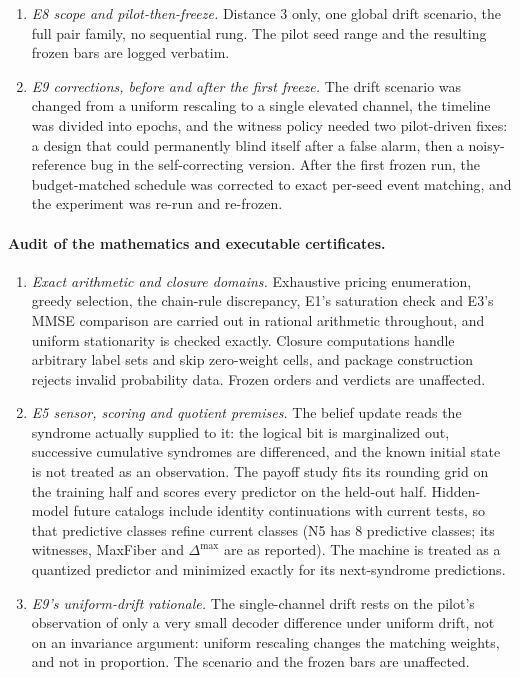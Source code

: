 \begin{enumerate}
\item \emph{E8 scope and pilot-then-freeze.} Distance 3 only, one global drift scenario, the full pair family, no sequential rung. The pilot seed range and the resulting frozen bars are logged verbatim. %
\item \emph{E9 corrections, before and after the first freeze.} The drift scenario was changed from a uniform rescaling to a single elevated channel, the timeline was divided into epochs, and the witness policy needed two pilot-driven fixes: a design that could permanently blind itself after a false alarm, then a noisy-reference bug in the self-correcting version. After the first frozen run, the budget-matched schedule was corrected to exact per-seed event matching, and the experiment was re-run and re-frozen. %
\end{enumerate}

\paragraph{Audit of the mathematics and executable certificates.}
\begin{enumerate}[resume]
\item \emph{Exact arithmetic and closure domains.} Exhaustive pricing enumeration, greedy selection, the chain-rule discrepancy, E1's saturation check and E3's MMSE comparison are carried out in rational arithmetic throughout, and uniform stationarity is checked exactly. Closure computations handle arbitrary label sets and skip zero-weight cells, and package construction rejects invalid probability data. Frozen orders and verdicts are unaffected. %
\item \emph{E5 sensor, scoring and quotient premises.} The belief update reads the syndrome actually supplied to it: the logical bit is marginalized out, successive cumulative syndromes are differenced, and the known initial state is not treated as an observation. The payoff study fits its rounding grid on the training half and scores every predictor on the held-out half. Hidden-model future catalogs include identity continuations with current tests, so that predictive classes refine current classes (N5 has 8 predictive classes; its witnesses, MaxFiber and $\Delta^{\max}$ are as reported). The machine is treated as a quantized predictor and minimized exactly for its next-syndrome predictions. %
\item \emph{E9's uniform-drift rationale.} The single-channel drift rests on the pilot's observation of only a very small decoder difference under uniform drift, not on an invariance argument: uniform rescaling changes the matching weights, and not in proportion. The scenario and the frozen bars are unaffected. %
\end{enumerate}
